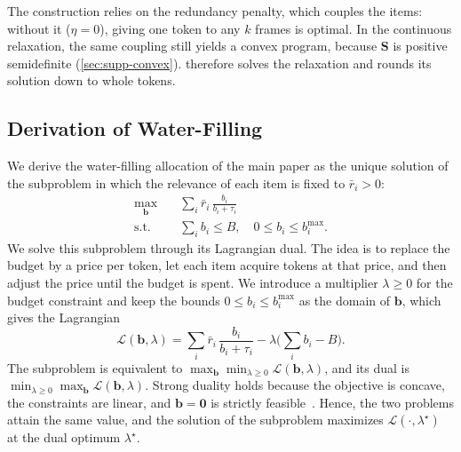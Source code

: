 \noindent The construction relies on the redundancy penalty, which couples the items: without it ($\eta=0$), giving one token to any $k$ frames is optimal. In the continuous relaxation, the same coupling still yields a convex program, because $\mathbf S$ is positive semidefinite (\cref{sec:supp-convex}). \name therefore solves the relaxation and rounds its solution down to whole tokens.

\subsection{Derivation of Water-Filling}
\label{sec:supp-waterfill}

We derive the water-filling allocation of the main paper as the unique solution of the subproblem in which the relevance of each item is fixed to $\bar r_i>0$:
\begin{equation}
\begin{aligned}
  \max_{\mathbf b}\quad & \sum_i \bar r_i\,\frac{b_i}{b_i+\tau_i}\\
  \text{s.t.}\quad & \sum_i b_i\le B,\quad 0\le b_i\le b_i^{\max} .
\end{aligned}
\label{eq:supp-fixed}
\end{equation}
We solve this subproblem through its Lagrangian dual. The idea is to replace the budget by a price per token, let each item acquire tokens at that price, and then adjust the price until the budget is spent. We introduce a multiplier $\lambda\ge0$ for the budget constraint and keep the bounds $0\le b_i\le b_i^{\max}$ as the domain of $\mathbf b$, which gives the Lagrangian
\begin{equation}
  \mathcal L(\mathbf b,\lambda)=\sum_i \bar r_i\,\frac{b_i}{b_i+\tau_i}-\lambda\Big(\sum_i b_i-B\Big) .
\label{eq:supp-lagrangian}
\end{equation}
The subproblem is equivalent to $\max_{\mathbf b}\min_{\lambda\ge0}\mathcal L(\mathbf b,\lambda)$, and its dual is $\min_{\lambda\ge0}\max_{\mathbf b}\mathcal L(\mathbf b,\lambda)$. Strong duality holds because the objective is concave, the constraints are linear, and $\mathbf b=\mathbf 0$ is strictly feasible~\cite{boyd2004}. Hence, the two problems attain the same value, and the solution of the subproblem maximizes $\mathcal L(\cdot,\lambda^\star)$ at the dual optimum $\lambda^\star$.

